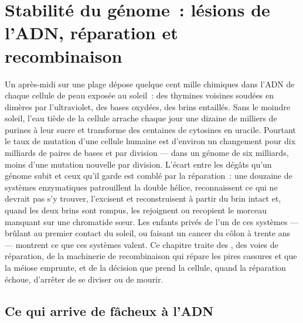 \chapter{Stabilité du génome~: lésions de l'ADN, réparation et recombinaison}\label{ch:b3:dna-repair}

Un après-midi sur une plage dépose quelque cent mille  chimiques
dans l'ADN de chaque cellule de peau exposée au soleil~: des thymines
voisines soudées en dimères par l'ultraviolet, des bases oxydées, des
brins entaillés. Sans le moindre soleil, l'eau tiède de la cellule
arrache chaque jour une dizaine de milliers de purines à leur sucre et
transforme des centaines de cytosines en uracile. Pourtant le taux de
mutation d'une cellule humaine est d'environ un changement pour dix
milliards de paires de bases et par division --- dans un génome de six
milliards, moins d'une mutation nouvelle par division. L'écart entre
les dégâts qu'un génome subit et ceux qu'il garde est comblé par la
réparation~: une douzaine de systèmes enzymatiques patrouillent la
double hélice, reconnaissent ce qui ne devrait pas s'y trouver,
l'excisent et reconstruisent à partir du brin intact et, quand les deux
brins sont rompus, les rejoignent ou recopient le morceau manquant sur
une chromatide sœur. Les enfants privés de l'un de ces systèmes ---
brûlant au premier contact du soleil, ou faisant un cancer du côlon à
trente ans --- montrent ce que ces systèmes valent. Ce chapitre traite
des , des voies de réparation, de la machinerie de recombinaison
qui répare les pires cassures et que la méiose emprunte, et de la
décision que prend la cellule, quand la réparation échoue, d'arrêter de
se diviser ou de mourir.

\section{Ce qui arrive de fâcheux à l'ADN}

